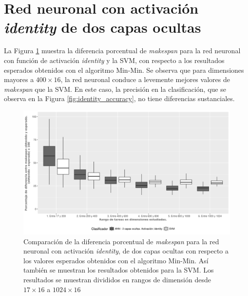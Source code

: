 \newpage %
 
\section{Red neuronal con activación \textit{identity} de dos capas ocultas}

La Figura \ref{fig:identity_makespan} muestra la diferencia porcentual de \textit{makespan} para la red neuronal con función de activación \textit{identity} y la SVM, con respecto a los resultados esperados obtenidos con el algoritmo Min-Min.
Se observa que para dimensiones mayores a $ 400 \times 16$, la red neuronal conduce a levemente mejores valores de \textit{makespan} que la SVM.
En este caso, la precisión en la clasificación, que se observa en la Figura \ref{fig:identity_accuracy}, no tiene diferencias sustanciales. 

\begin{figure}[H]
  \centering
  \includegraphics[width=\columnwidth]{imagenes/identity/2_medianas_diferenciasann_2_capas_ocultas_identity.png}
  \caption{Comparación de la diferencia porcentual de \textit{makespan} para la red neuronal con activación \textit{identity}, de dos capas ocultas con respecto a los valores esperados obtenidos con el algoritmo Min-Min.
Así también se muestran los resultados obtenidos para la SVM.
Los resultados se muestran divididos en rangos de dimensión desde $ 17 \times 16$ a $ 1024 \times 16$}
  \label{fig:identity_makespan}
\end{figure}

\newpage %

